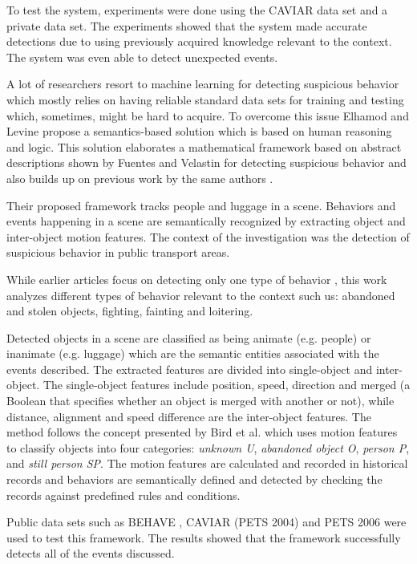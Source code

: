 To test the system, experiments were done using the CAVIAR data set \cite{n19} and a private data set. The experiments showed that the system made accurate detections due to using previously acquired knowledge relevant to the context. The system was even able to detect unexpected events.

A lot of researchers resort to machine learning for detecting suspicious behavior which mostly relies on having reliable standard data sets for training and testing which, sometimes, might be hard to acquire. To overcome this issue Elhamod and Levine \cite{n2} propose a semantics-based solution which is based on human reasoning and logic. This solution elaborates a mathematical framework based on abstract descriptions shown by Fuentes and Velastin \cite{n3} for detecting suspicious behavior and also builds up on previous work by the same authors \cite{n4}.

Their proposed framework tracks people and luggage in a scene. Behaviors and events happening in a scene are semantically recognized by extracting object and inter-object motion features. The context of the investigation was the detection of suspicious behavior in public transport areas.

While earlier articles focus on detecting only one type of behavior \cite{n5,n6}, this work analyzes different types of behavior relevant to the context such us: abandoned and stolen objects, fighting, fainting and loitering.

Detected objects in a scene are classified as being animate (e.g. people) or inanimate (e.g. luggage) which are the semantic entities associated with the events described. The extracted features are divided into single-object and inter-object. The single-object features include position, speed, direction and merged (a Boolean that specifies whether an object is merged with another or not), while distance, alignment and speed difference are the inter-object features. The method follows the concept presented by Bird et al. \cite{n6} which uses motion features to classify objects into four categories: \textit{unknown U}, \textit{abandoned object O}, \textit{person P}, and \textit{still person SP}. The motion features are calculated and recorded in historical records and behaviors are semantically defined and detected by checking the records against predefined rules and conditions.

Public data sets such as BEHAVE \cite{n20}, CAVIAR (PETS 2004) \cite{n21} and PETS 2006 \cite{n22} were used to test this framework. The results showed that the framework successfully detects all of the events discussed.

